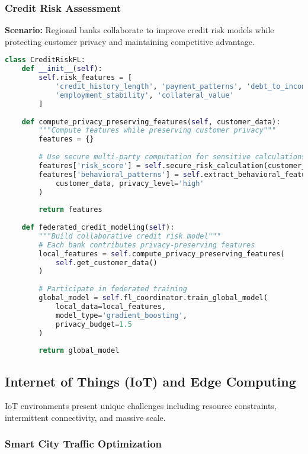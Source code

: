 \subsubsection{Credit Risk Assessment}

\textbf{Scenario:} Regional banks collaborate to improve credit risk models while protecting customer privacy and maintaining competitive advantage.

\begin{lstlisting}[language=python, caption=Credit Risk FL Implementation]
class CreditRiskFL:
    def __init__(self):
        self.risk_features = [
            'credit_history_length', 'payment_patterns', 'debt_to_income',
            'employment_stability', 'collateral_value'
        ]
        
    def compute_privacy_preserving_features(self, customer_data):
        """Compute features while preserving customer privacy"""
        features = {}
        
        # Use secure multi-party computation for sensitive calculations
        features['risk_score'] = self.secure_risk_calculation(customer_data)
        features['behavioral_patterns'] = self.extract_behavioral_features(
            customer_data, privacy_level='high'
        )
        
        return features
        
    def federated_credit_modeling(self):
        """Build collaborative credit risk model"""
        # Each bank contributes privacy-preserving features
        local_features = self.compute_privacy_preserving_features(
            self.get_customer_data()
        )
        
        # Participate in federated training
        global_model = self.fl_coordinator.train_global_model(
            local_data=local_features,
            model_type='gradient_boosting',
            privacy_budget=1.5
        )
        
        return global_model
\end{lstlisting}

\subsection{Internet of Things (IoT) and Edge Computing}

IoT environments present unique challenges including resource constraints, intermittent connectivity, and massive scale.

\subsubsection{Smart City Traffic Optimization}

